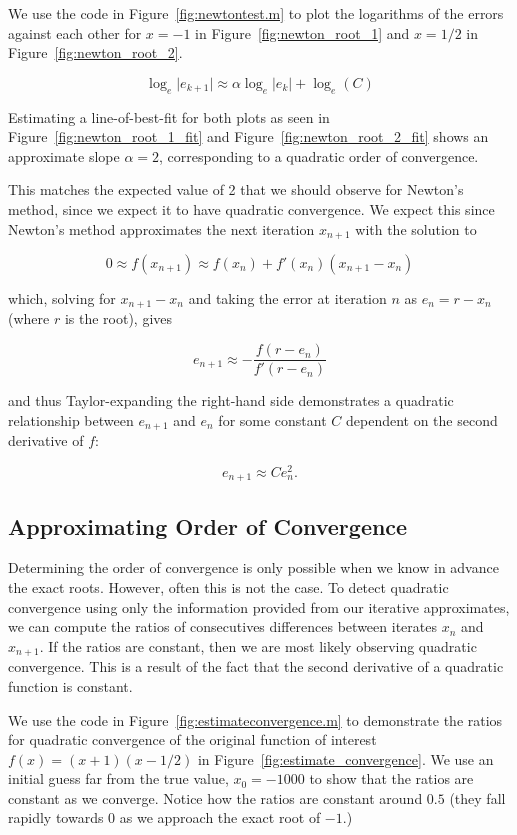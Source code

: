 \documentclass[11pt]{article}
\begin{document}
We use the code in Figure~\ref{fig:newtontest.m} to plot the logarithms of the errors against each other for $x = -1$ in Figure~\ref{fig:newton_root_1} and $x = 1/2$ in Figure~\ref{fig:newton_root_2}.

$$
\log_e \vert e_{k + 1} \vert \approx \alpha \log_e \vert e_k \vert + \log_e (C)
$$

Estimating a line-of-best-fit for both plots as seen in Figure~\ref{fig:newton_root_1_fit} and Figure~\ref{fig:newton_root_2_fit} shows an approximate slope $\alpha = 2$, corresponding to a quadratic order of convergence.

This matches the expected value of 2 that we should observe for Newton's method, since we expect it to have quadratic convergence. We expect this since Newton's method approximates the next iteration $x_{n + 1}$ with the solution to

$$
0 \approx f(x_{n + 1}) \approx f(x_n) + f'(x_n)(x_{n + 1} - x_n)
$$

which, solving for  $x_{n + 1} - x_n$ and taking the error at iteration $n$ as $e_n = r - x_n$ (where $r$ is the root), gives

$$
e_{n + 1} \approx -\frac{f(r - e_n)}{f'(r - e_n)}
$$

and thus Taylor-expanding the right-hand side demonstrates a quadratic relationship between $e_{n + 1}$ and $e_n$ for some constant $C$ dependent on the second derivative of $f$:

$$  
e_{n + 1} \approx Ce_n^2.
$$

\subsection{Approximating Order of Convergence}

Determining the order of convergence is only possible when we know in advance the exact roots. However, often this is not the case. To detect quadratic convergence using only the information provided from our iterative approximates, we can compute the ratios of consecutives differences between iterates $x_n$ and $x_{n + 1}$. If the ratios are constant, then we are most likely observing quadratic convergence. This is a result of the fact that the second derivative of a quadratic function is constant.

We use the code in Figure~\ref{fig:estimateconvergence.m} to demonstrate the ratios for quadratic convergence of the original function of interest $f(x) = (x + 1)(x - 1/2)$ in Figure~\ref{fig:estimate_convergence}. We use an initial guess far from the true value, $x_0 = -1000$ to show that the ratios are constant as we converge. Notice how the ratios are constant around $0.5$ (they fall rapidly towards 0 as we approach the exact root of $-1$.)
\end{document}
